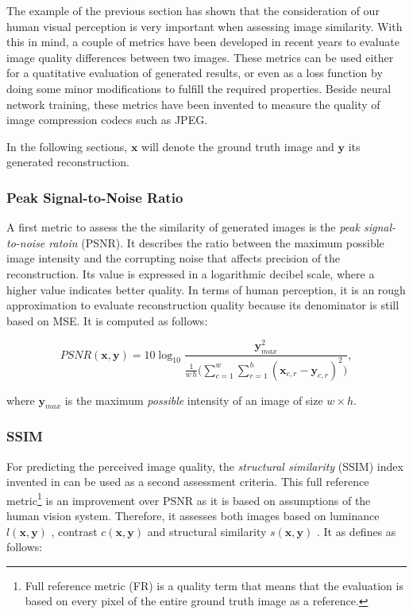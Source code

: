 The example of the previous section has shown that the consideration of our human visual perception is very important when assessing image similarity. With this in mind, a couple of metrics have been developed in recent years to evaluate image quality differences between two images. These metrics can be used either for a quatitative evaluation of generated results, or even as a loss function by doing some minor modifications to fulfill the required properties. Beside neural network training, these metrics have been invented to measure the quality of image compression codecs such as JPEG.

In the following sections, $ \textbf{x} $ will denote the ground truth image and $ \textbf{y} $ its generated reconstruction.

\subsubsection*{Peak Signal-to-Noise Ratio}

A first metric to assess the the similarity of generated images is the \textit{peak signal-to-noise ratoin} (PSNR). It describes the ratio between the maximum possible image intensity and the corrupting noise that affects precision of the reconstruction. Its value is expressed in a logarithmic decibel scale, where a higher value indicates better quality. In terms of human perception, it is an rough approximation to evaluate reconstruction quality because its denominator is still based on MSE. It is computed as follows:

\begin{equation} \label{eq:psnr}
  PSNR(\textbf{x}, \textbf{y}) = 10 \log_{10} \frac{\textbf{y}_{max}^2}{\frac{1}{w \, h} \Big(\sum_{c=1}^{w} \sum_{r=1}^{h} (\textbf{x}_{c,r} - \textbf{y}_{c,r})^2 \Big)} ,
\end{equation}

where $ \textbf{y}_{max} $ is the maximum \textit{possible} intensity of an image of size $ w \times h $.


\subsubsection*{SSIM}

For predicting the perceived image quality, the \textit{structural similarity} (SSIM) index invented in \parencite{ssim} can be used as a second assessment criteria. This full reference metric\footnote{Full reference metric (FR) is a quality term that means that the evaluation is based on every pixel of the entire ground truth image as a reference.} is an improvement over PSNR as it is based on assumptions of the human vision system. Therefore, it assesses both images based on luminance $ l(\textbf{x}, \textbf{y}) $ , contrast $ c(\textbf{x}, \textbf{y}) $ and structural similarity $ s(\textbf{x}, \textbf{y}) $ \parencite{ms-ssim}. It as defines as follows:

